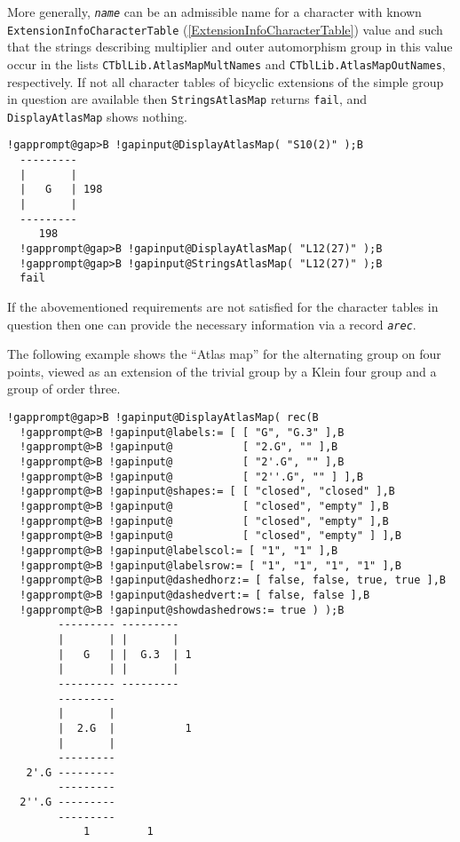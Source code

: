 \documentclass[a4paper,11pt]{report}
\begin{document}
{{{ More generally, \mbox{\texttt{\mdseries\slshape name}} can be an admissible name for a character with known \texttt{ExtensionInfoCharacterTable} (\ref{ExtensionInfoCharacterTable}) value and such that the strings describing multiplier and outer automorphism
group in this value occur in the lists \texttt{CTblLib.AtlasMapMultNames} and \texttt{CTblLib.AtlasMapOutNames}, respectively. If not all character tables of bicyclic extensions of the
simple group in question are available then \texttt{StringsAtlasMap} returns \texttt{fail}, and \texttt{DisplayAtlasMap} shows nothing. 

 
\begin{Verbatim}[commandchars=!@B,fontsize=\small,frame=single,label=Example]
  !gapprompt@gap>B !gapinput@DisplayAtlasMap( "S10(2)" );B
  ---------    
  |       |    
  |   G   | 198
  |       |    
  ---------    
     198   
  !gapprompt@gap>B !gapinput@DisplayAtlasMap( "L12(27)" );B
  !gapprompt@gap>B !gapinput@StringsAtlasMap( "L12(27)" );B
  fail
\end{Verbatim}
 

 If the abovementioned requirements are not satisfied for the character tables
in question then one can provide the necessary information via a record \mbox{\texttt{\mdseries\slshape arec}}. 

 The following example shows the ``\textsf{Atlas} map'' for the alternating group on four points, viewed as an extension of the
trivial group by a Klein four group and a group of order three. 

 
\begin{Verbatim}[commandchars=!@B,fontsize=\small,frame=single,label=Example]
  !gapprompt@gap>B !gapinput@DisplayAtlasMap( rec(B
  !gapprompt@>B !gapinput@labels:= [ [ "G", "G.3" ],B
  !gapprompt@>B !gapinput@           [ "2.G", "" ],B
  !gapprompt@>B !gapinput@           [ "2'.G", "" ],B
  !gapprompt@>B !gapinput@           [ "2''.G", "" ] ],B
  !gapprompt@>B !gapinput@shapes:= [ [ "closed", "closed" ],B
  !gapprompt@>B !gapinput@           [ "closed", "empty" ],B
  !gapprompt@>B !gapinput@           [ "closed", "empty" ],B
  !gapprompt@>B !gapinput@           [ "closed", "empty" ] ],B
  !gapprompt@>B !gapinput@labelscol:= [ "1", "1" ],B
  !gapprompt@>B !gapinput@labelsrow:= [ "1", "1", "1", "1" ],B
  !gapprompt@>B !gapinput@dashedhorz:= [ false, false, true, true ],B
  !gapprompt@>B !gapinput@dashedvert:= [ false, false ],B
  !gapprompt@>B !gapinput@showdashedrows:= true ) );B
        --------- ---------  
        |       | |       |  
        |   G   | |  G.3  | 1
        |       | |       |  
        --------- ---------  
        ---------            
        |       |            
        |  2.G  |           1
        |       |            
        ---------            
   2'.G ---------          
        ---------          
  2''.G ---------          
        ---------          
            1         1    
\end{Verbatim}
 

}}}
\end{document}
